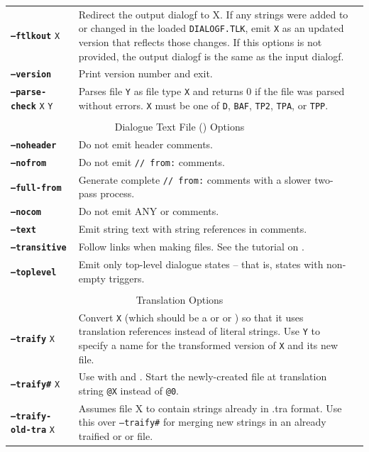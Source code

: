 \documentclass{article}
\def\ttref#1{\ahrefloc{#1}{\tt #1}}
\def\DEFINE#1{{\tt \bf #1}\label{#1}\index{#1}}
\def\t#1{{\tt #1}}
\begin{document}
\begin{tabular}{lp{10in}|p{10in}}
\DEFINE{--ftlkout} \t{X} & Redirect the output dialogf to X. If any strings were added to or changed in the
loaded \t{DIALOGF.TLK}, emit \t{X} as an updated version that reflects
those changes. If this options is not provided, the output dialogf is the same as the input dialogf. \\
\DEFINE{--version} & Print version number and exit. \\
\DEFINE{--parse-check} \t{X} \t{Y} & Parses file \t{Y} as file type
\t{X} and returns 0 if the file was parsed without errors. \t{X} must
be one of \t{D}, \t{BAF}, \t{TP2}, \t{TPA}, or \t{TPP}. \\
\\
\multicolumn{2}{c}{ \color{red} Dialogue Text File (\ttref{D}) Options} \\
\DEFINE{--noheader} &	Do not emit \ttref{D} header comments. \\
\DEFINE{--nofrom} &	Do not emit \ttref{D} {\tt // from:} comments. \\
\DEFINE{--full-from} &  Generate complete {\tt // from:} comments with a
slower two-pass process. \\
\DEFINE{--nocom} & Do not emit ANY \ttref{D} or \ttref{BAF} comments. \\
\DEFINE{--text} & Emit string text with string references in comments. \\
\DEFINE{--transitive} & Follow \ttref{EXTERN} links when making \ttref{D}
files. See the tutorial on \ttref{--transitive}. \\
\DEFINE{--toplevel} & Emit only top-level dialogue states -- that is,
states with non-empty triggers. \\
\\
\multicolumn{2}{c}{ \color{red} Translation Options} \\
\DEFINE{--traify} \t{X} & Convert \t{X} (which should be a \ttref{D} or \ttref{TP2} or \ttref{BAF}) so that it uses translation references instead of literal strings. Use \ttref{--out} \t{Y} to specify a name for the transformed version of \t{X} and its new \ttref{TRA} file. \\
\DEFINE{--traify\#} \t{X} &	Use with \ttref{--traify} and \ttref{--traify-tlk}. Start the newly-created \ttref{TRA} file at translation string {\tt @X} instead of {\tt @0}. \\
\DEFINE{--traify-old-tra} \t{X} & Assumes file X to contain strings already in .tra format.
Use this over \t{--traify\#} for merging new strings in an already traified \ttref{D} or \ttref{TP2} or \ttref{BAF} file.
\\

\end{tabular}
\end{document}
